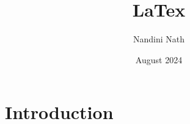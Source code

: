 \documentclass{article}
\title{LaTex}
\author{Nandini Nath}
\date{August 2024}
\begin{document}
\maketitle

\section{Introduction}
\end{document}

